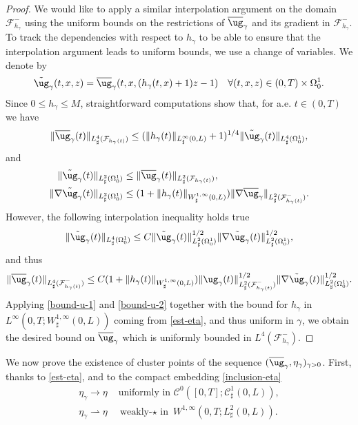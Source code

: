 \begin{proof}
We would like to apply a similar interpolation argument on the domain $\mathcal F_{h_{\gamma}}^{-}$ using the uniform bounds on the restrictions of $\overline{\ug}_{\gamma}$ and its gradient in $\mathcal F_{h_{\gamma}}^{-}$. To track the dependencies with respect to $h_{\gamma}$ to be able to ensure that the interpolation argument leads to uniform bounds, we use a change of variables. We denote by
\[
\tilde{\ug}_{\gamma}(t,x,z) = \overline{\ug}_{\gamma}(t,x,(h_{\gamma}(t,x) + 1)z - 1 ) \quad \forall (t,x,z) \in (0,T) \times \Omega_0^1.
\]
Since $0 \leq h_{\gamma} \leq M$, straightforward computations show that, for a.e. $t \in (0,T)$ we have
\[
\|\overline{\ug}_{\gamma}(t)\|_{L_\sharp^4(\mathcal F_{h_{\gamma}(t)})} \leq (\|h_{\gamma}(t)\|_{L^{\infty}_{\sharp}(0,L)}+1)^{1/4} \|\tilde{\ug}_{\gamma}(t)\|_{L_\sharp^4( \Omega_0^1)},
\]
and
\begin{align*}
\|\tilde{\ug}_{\gamma}(t)\|_{L_\sharp^2( \Omega_0^1)} & \leq \|\overline{\ug}_{\gamma}(t)\|_{L_\sharp^2(\mathcal F_{h_{\gamma}(t)})}, \\
\|\nabla \tilde{\ug}_{\gamma}(t)\|_{L_\sharp^2( \Omega_0^1)} & \leq (1+ \|h_{\gamma}(t)\|_{W^{1,\infty}_{\sharp}(0,L)}) \|\nabla \overline{\ug}_{\gamma}\|_{L_\sharp^2(\mathcal F^-_{h_{\gamma}(t)})}.
\end{align*}
However, the following interpolation inequality holds true
\[
\|\tilde{\ug}_{\gamma}(t)\|_{L_\sharp^4( \Omega_0^1)} \leq C \|\tilde{\ug}_{\gamma}(t)\|^{1/2}_{L_\sharp^2( \Omega_0^1)}\|\nabla \tilde{\ug}_{\gamma}(t)\|^{1/2}_{L_\sharp^2( \Omega_0^1)},
\]
and thus
\[
\|\overline{\ug}_{\gamma}(t)\|_{L_\sharp^4(\mathcal F^{-}_{h_{\gamma}(t)})} \leq C(1+ \|h_{\gamma}(t)\|_{W^{1,\infty}_{\sharp}(0,L)}) \|{\ug}_{\gamma}(t)\|^{1/2}_{L_\sharp^2(\mathcal F^{-}_{h_{\gamma}(t)})}\|\nabla \tilde{\ug}_{\gamma}(t)\|^{1/2}_{L_\sharp^2(\Omega_0^1)}.
\]
Applying \eqref{bound-u-1} and \eqref{bound-u-2} together with the bound for
$h_{\gamma}$ in $L^{\infty}(0,T;W^{1,\infty}_{\sharp}(0,L))$ coming from \eqref{est-eta}, and thus uniform in $\gamma$, we obtain the desired bound on $\overline{\ug}_{\gamma}$ which is uniformly bounded in $L^4(\mathcal F^{-}_{h_{\gamma}})$. \end{proof}

We now prove the existence of cluster points of the sequence $(\overline{\ug}_{\gamma},\eta_{\gamma})_{\gamma >0}$. First, thanks to \eqref{est-eta}, and to the compact embedding \eqref{inclusion-eta}
\[
\begin{split}\textstyle
\eta_{\gamma}\to\eta& \text{ uniformly in }\mathcal{C}^{0}([0,T];\mathcal{C}^{1}_{\sharp}(0,L)),\\
\eta_{\gamma}\rightharpoonup\eta& \text{ weakly-$\star$ in }W^{1,\infty}(0,T;L^2_{\sharp}(0,L)).
\end{split}
\]

